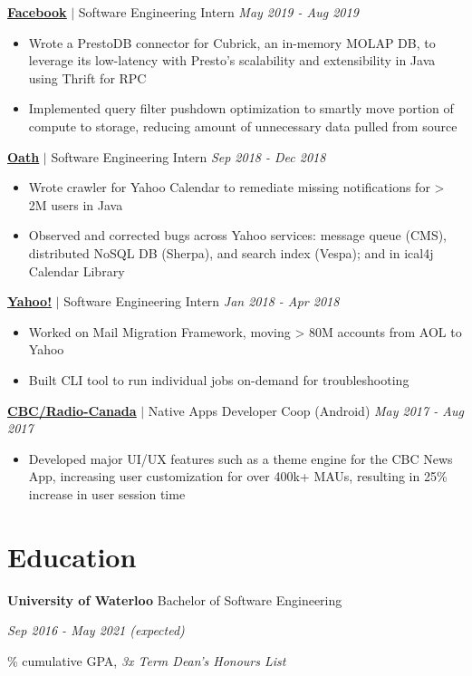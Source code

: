 \documentclass[paper=a4,fontsize=15pt]{scrartcl}
\newcommand{\quarterspace}{\vspace*{0.25em}}
\newcommand{\bighalfspace}{\vspace*{0.75em}}
\begin{document}
\bighalfspace
\normalsize
\noindent \href{https://facebook.com}{\textbf{\ul{Facebook}}}
$\vert$ \small Software Engineering Intern
{\hfill \footnotesize \textit{May 2019 - Aug 2019}}
\begin{itemize}[noitemsep,leftmargin=20pt,label=\raisebox{0.25ex}{\tiny$\bullet$},topsep=5pt]
  \small
    \item Wrote a PrestoDB connector for Cubrick, an in-memory MOLAP DB, to leverage its low-latency with Presto's scalability and extensibility in Java using Thrift for RPC
    \item Implemented query filter pushdown optimization to smartly move portion of compute to storage, reducing amount of unnecessary data pulled from source
\end{itemize}

\bighalfspace
\normalsize
\noindent \href{https://mail.yahoo.com}{\textbf{\ul{Oath}}}
$\vert$ \small Software Engineering Intern
{\hfill \footnotesize \textit{Sep 2018 - Dec 2018}}
\begin{itemize}[noitemsep,leftmargin=20pt,label=\raisebox{0.25ex}{\tiny$\bullet$},topsep=5pt]
  \small
    \item Wrote crawler for Yahoo Calendar to remediate missing notifications for > 2M users in Java
    \item Observed and corrected bugs across Yahoo services: message queue (CMS), distributed NoSQL DB (Sherpa), and search index (Vespa); and in ical4j Calendar Library
    
\end{itemize}

\bighalfspace
\normalsize
\noindent \href{https://mail.yahoo.com}{\textbf{\ul{Yahoo!}}}
$\vert$ \small Software Engineering Intern
{\hfill \footnotesize \textit{Jan 2018 - Apr 2018}}
\begin{itemize}[noitemsep,leftmargin=20pt,label=\raisebox{0.25ex}{\tiny$\bullet$},topsep=5pt]
  \small
    \item Worked on Mail Migration Framework, moving > 80M accounts from AOL to Yahoo
    \item Built CLI tool to run individual jobs on-demand for troubleshooting
\end{itemize}

\bighalfspace
\normalsize
\noindent \href{https://cbc.ca}{\ul{\textbf{CBC/Radio-Canada}}}
$\vert$ \small Native Apps Developer Coop (Android)
{\hfill \footnotesize \textit{May 2017 - Aug 2017}}
\begin{itemize}[noitemsep,leftmargin=20pt,label=\raisebox{0.25ex}{\tiny$\bullet$},topsep=5pt]
  \small
    \item Developed major UI/UX features such as a theme engine for the CBC News App, increasing user customization for over 400k+ MAUs, resulting in 25\% increase in user session time
\end{itemize}

\section*{Education}{}
\noindent \textbf{University of Waterloo} Bachelor of Software Engineering \par
\quarterspace
\footnotesize
\noindent \textit{Sep 2016 - May 2021 (expected)} \par
{}\% cumulative GPA, \textit{3x Term Dean's Honours List}
\end{document}
